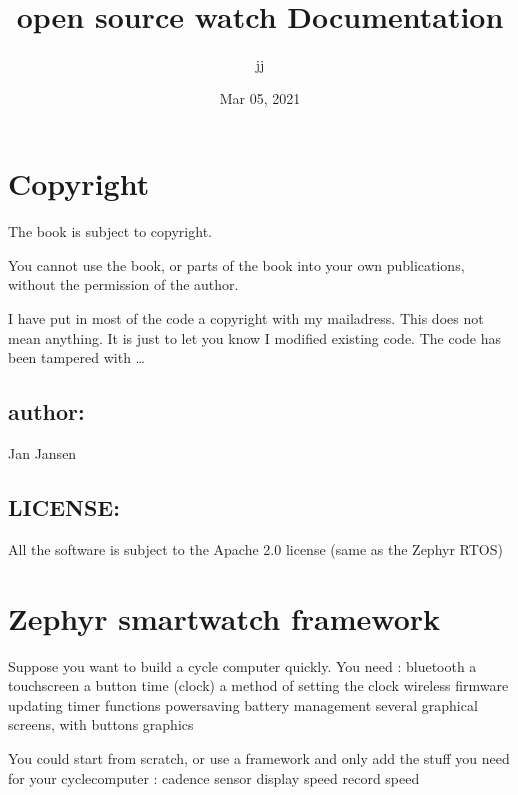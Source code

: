 \documentclass[letterpaper,10pt,english]{sphinxmanual}
\title{open source watch Documentation}
\date{Mar 05, 2021}
\author{jj}
\begin{document}
\pagestyle{empty}
\sphinxmaketitle
\pagestyle{plain}
\sphinxtableofcontents
\pagestyle{normal}
\label{\detokenize{index::doc}}
\noindent{}




\chapter{Copyright}
\label{\detokenize{copyright:copyright}}\label{\detokenize{copyright::doc}}
The book is subject to copyright.

You cannot use the book, or parts of the book into your own publications, without the permission of the author.

I have put in most of the code a copyright with my mailadress.
This does not mean anything. It is just to let you know I modified existing code. The code has been tampered with …


\section{author:}
\label{\detokenize{copyright:author}}
Jan Jansen


\section{LICENSE:}
\label{\detokenize{copyright:license}}
All the software is subject to the Apache 2.0 license (same as the Zephyr RTOS)


\chapter{Zephyr  smartwatch framework}
\label{\detokenize{content:zephyr-smartwatch-framework}}\label{\detokenize{content::doc}}
Suppose you want to build a cycle computer quickly.
You need :
\sphinxhyphen{} bluetooth
\sphinxhyphen{} a touchscreen
\sphinxhyphen{} a button
\sphinxhyphen{} time (clock)
\sphinxhyphen{} a method of setting the clock
\sphinxhyphen{} wireless firmware updating
\sphinxhyphen{} timer functions
\sphinxhyphen{} powersaving
\sphinxhyphen{} battery management
\sphinxhyphen{} several graphical screens, with buttons graphics

You could start from scratch, or use a framework and only add the stuff you need for your cyclecomputer :
\sphinxhyphen{} cadence sensor
\sphinxhyphen{} display speed
\sphinxhyphen{} record speed
\end{document}
